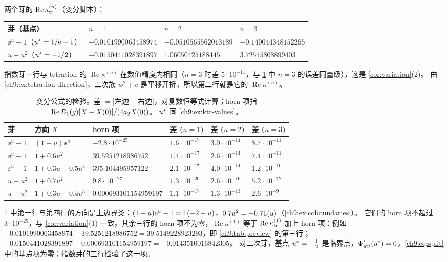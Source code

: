 \begin{example}[法向常数]\label{ch9:ex:ktr-values}
两个芽的 $\operatorname{Re}\kappa_{\mathrm{tr}}^{(n)}$（变分脚本）：
\begin{center}\small
\begin{tabular}{llll}
\toprule
芽（基点） & $n=1$ & $n=2$ & $n=3$\\
\midrule
$\ee^u-1$（$u^{*}=1/\mathrm{e}-1$） & $-0.0101990063458974$ & $-0.0510565562013189$ & $-0.140044348152265$\\
$u+u^2$（$u^{*}=-1/2$） & $-0.0150441028391897$ & $1.06050425188445$ & $3.72545808899403$\\
\bottomrule
\end{tabular}
\end{center}
指数芽一行与 tetration 的 $\operatorname{Re}\kappa^{(n)}$ 在数值精度内相同（$n=3$ 时差 $5\cdot10^{-11}$，与 \cref{ch9:tab:variation} 中 $n=3$ 的误差同量级），这是 \cref{cor:variation}(2)。
由 \cref{ch9:ex:tetration-direction}，二次族 $w^2+c$ 是平移开折，所以第二行就是它的 $\operatorname{Re}\kappa^{(n)}$。
\end{example}

\begin{table}[htbp]
\centering\small
\caption{变分公式的检验。差 $=|\text{左边}-\text{右边}|$，对复数恒等式计算；horn 项指 $\operatorname{Re}\mathcal D_1(g)[X-X(0)]/(4a_2X(0))$。
$u^{*}$ 同 \cref{ch9:ex:ktr-values}。}
\label{ch9:tab:variation}
\begin{tabular}{llllll}
\toprule
芽 & 方向 $X$ & horn 项 & 差 ($n=1$) & 差 ($n=2$) & 差 ($n=3$)\\
\midrule
$\ee^u-1$ & $(1+u)\ee^u$ & $-2.8\cdot10^{-25}$ & $1.6\cdot10^{-17}$ & $3.0\cdot10^{-14}$ & $8.7\cdot10^{-11}$\\
$\ee^u-1$ & $1+0.6u^2$ & $39.5251218986752$ & $1.4\cdot10^{-17}$ & $2.6\cdot10^{-14}$ & $7.4\cdot10^{-11}$\\
$\ee^u-1$ & $1+0.3u+0.5u^4$ & $395.104495957122$ & $2.1\cdot10^{-17}$ & $4.0\cdot10^{-14}$ & $1.2\cdot10^{-10}$\\
$u+u^2$ & $1+0.7u^2$ & $9.8\cdot10^{-27}$ & $1.3\cdot10^{-20}$ & $2.6\cdot10^{-16}$ & $5.2\cdot10^{-12}$\\
$u+u^2$ & $1+0.3u-0.4u^3$ & $0.000693101154959197$ & $1.1\cdot10^{-17}$ & $1.3\cdot10^{-13}$ & $2.6\cdot10^{-9}$\\
\bottomrule
\end{tabular}
\end{table}

\cref{ch9:tab:variation} 中第一行与第四行的方向是上边界类：$(1+u)\mathrm{e}^u-1=\mathsf L(-2-u)$，$0.7u^2=-0.7\mathsf L(u)$（\cref{ch9:ex:coboundaries}）。
它们的 horn 项不超过 $3\cdot10^{-25}$，与 \cref{cor:variation}(1) 一致。其余三行的 horn 项不为零，$\operatorname{Re}\kappa^{(1)}$ 等于
$\operatorname{Re}\kappa_{\mathrm{tr}}^{(1)}$ 加上 horn 项：例如 $-0.0101990063458974+39.5251218986752=39.5149228923293$，即 \cref{ch9:tab:preview} 的第三行；
$-0.0150441028391897+0.000693101154959197=-0.0143510016842305$。
对二次芽，基点 $u^{*}=-\tfrac12$ 是临界点，$\Phi_{\mathrm{att}}'(u^{*})=0$，\eqref{ch9:eq:split} 中的基点项为零；指数芽的三行检验了这一项。

